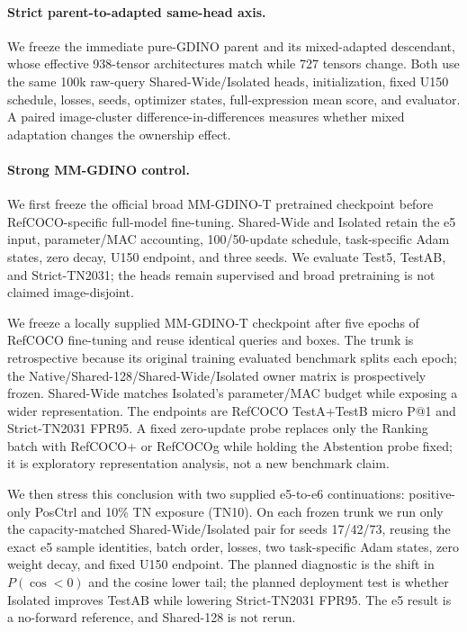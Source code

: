 \paragraph{Strict parent-to-adapted same-head axis.}
We freeze the immediate pure-GDINO parent and its mixed-adapted descendant, whose
effective 938-tensor architectures match while 727 tensors change.  Both use
the same 100k raw-query Shared-Wide/Isolated heads, initialization, fixed U150
schedule, losses, seeds, optimizer states, full-expression mean score, and
evaluator.  A paired image-cluster difference-in-differences measures whether
mixed adaptation changes the ownership effect.

\paragraph{Strong MM-GDINO control.}
We first freeze the official broad MM-GDINO-T pretrained checkpoint before
RefCOCO-specific full-model fine-tuning.  Shared-Wide and Isolated retain the
e5 input, parameter/MAC accounting, 100/50-update schedule, task-specific Adam
states, zero decay, U150 endpoint, and three seeds.  We evaluate Test5, TestAB,
and Strict-TN2031; the heads remain supervised and broad pretraining is not
claimed image-disjoint.

We freeze a locally supplied MM-GDINO-T checkpoint after five epochs of
RefCOCO fine-tuning and reuse identical queries and boxes.  The trunk is
retrospective because its original training evaluated benchmark splits each
epoch; the Native/Shared-128/Shared-Wide/Isolated owner matrix is prospectively
frozen.  Shared-Wide matches Isolated's parameter/MAC budget while exposing a
wider representation.  The endpoints are RefCOCO TestA+TestB micro P@1 and
Strict-TN2031 FPR95.  A fixed zero-update probe replaces only the Ranking batch
with RefCOCO+ or RefCOCOg while holding the Abstention probe fixed; it is
exploratory representation analysis, not a new benchmark claim.

We then stress this conclusion with two supplied e5-to-e6 continuations:
positive-only PosCtrl and 10\% TN exposure (TN10).  On each frozen trunk we run
only the capacity-matched Shared-Wide/Isolated pair for seeds 17/42/73, reusing
the exact e5 sample identities, batch order, losses, two task-specific Adam
states, zero weight decay, and fixed U150 endpoint.  The planned diagnostic is
the shift in $P(\cos<0)$ and the cosine lower tail; the planned deployment test
is whether Isolated improves TestAB while lowering Strict-TN2031 FPR95.  The
e5 result is a no-forward reference, and Shared-128 is not rerun.

